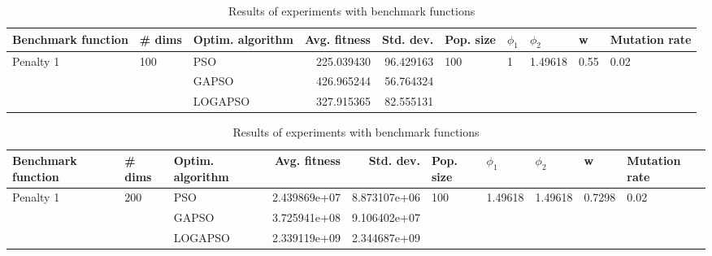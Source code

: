 \documentclass{article}
\begin{document}
\begin{table}
\centering
\caption{Results of experiments with benchmark functions}
\begin{tabular}{lllrrlllll}
\toprule
        Benchmark function &              \# dims & Optim. algorithm &  Avg. fitness &  Std. dev. &            Pop. size &         $\phi_{1}$ &               $\phi_{2}$ &                     w &         Mutation rate \\
\midrule
\multirow{3}{*}{Penalty 1} & \multirow{3}{*}{100} &              PSO &    225.039430 &  96.429163 & \multirow{3}{*}{100} & \multirow{3}{*}{1} & \multirow{3}{*}{1.49618} & \multirow{3}{*}{0.55} & \multirow{3}{*}{0.02} \\
                           &                      &            GAPSO &    426.965244 &  56.764324 &                      &                    &                          &                       &                       \\
                           &                      &          LOGAPSO &    327.915365 &  82.555131 &                      &                    &                          &                       &                       \\
\bottomrule
\end{tabular}
\end{table}
\begin{table}
\centering
\caption{Results of experiments with benchmark functions}
\begin{tabular}{lllrrlllll}
\toprule
        Benchmark function &              \# dims & Optim. algorithm &  Avg. fitness &    Std. dev. &            Pop. size &               $\phi_{1}$ &               $\phi_{2}$ &                       w &         Mutation rate \\
\midrule
\multirow{3}{*}{Penalty 1} & \multirow{3}{*}{200} &              PSO &  2.439869e+07 & 8.873107e+06 & \multirow{3}{*}{100} & \multirow{3}{*}{1.49618} & \multirow{3}{*}{1.49618} & \multirow{3}{*}{0.7298} & \multirow{3}{*}{0.02} \\
                           &                      &            GAPSO &  3.725941e+08 & 9.106402e+07 &                      &                          &                          &                         &                       \\
                           &                      &          LOGAPSO &  2.339119e+09 & 2.344687e+09 &                      &                          &                          &                         &                       \\
\bottomrule
\end{tabular}
\end{table}
\end{document}
